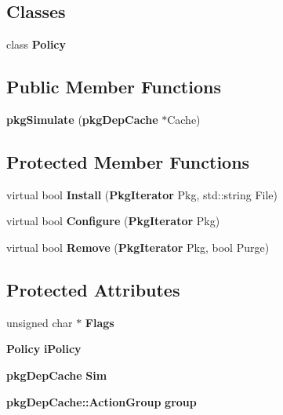 \subsection*{\-Classes}
\begin{DoxyCompactItemize}
\item 
class {\bf \-Policy}
\end{DoxyCompactItemize}
\subsection*{\-Public \-Member \-Functions}
\begin{DoxyCompactItemize}
\item 
{\bfseries pkg\-Simulate} ({\bf pkg\-Dep\-Cache} $\ast$\-Cache)\label{classpkgSimulate_a7f94751989e0b0d577dd785513c22e6c}

\end{DoxyCompactItemize}
\subsection*{\-Protected \-Member \-Functions}
\begin{DoxyCompactItemize}
\item 
virtual bool {\bfseries \-Install} ({\bf \-Pkg\-Iterator} \-Pkg, std\-::string \-File)\label{classpkgSimulate_a7ee4c25b06686737612d9e9b032f3809}

\item 
virtual bool {\bfseries \-Configure} ({\bf \-Pkg\-Iterator} \-Pkg)\label{classpkgSimulate_a690a971db6740b8b46028b681bff0224}

\item 
virtual bool {\bfseries \-Remove} ({\bf \-Pkg\-Iterator} \-Pkg, bool \-Purge)\label{classpkgSimulate_a8cfd5ded684ae12c6eaff1fe2a893f38}

\end{DoxyCompactItemize}
\subsection*{\-Protected \-Attributes}
\begin{DoxyCompactItemize}
\item 
unsigned char $\ast$ {\bfseries \-Flags}\label{classpkgSimulate_a28365bb942c08d1e6d05042fe69ddf5b}

\item 
{\bf \-Policy} {\bfseries i\-Policy}\label{classpkgSimulate_ab49a88ebc1359b269287b9d875226c36}

\item 
{\bf pkg\-Dep\-Cache} {\bfseries \-Sim}\label{classpkgSimulate_a923d0c8f0c466a575f239aaff25c3601}

\item 
{\bf pkg\-Dep\-Cache\-::\-Action\-Group} {\bfseries group}\label{classpkgSimulate_a2f691c766ac614a9997f9ce03948f6f0}

\end{DoxyCompactItemize}


